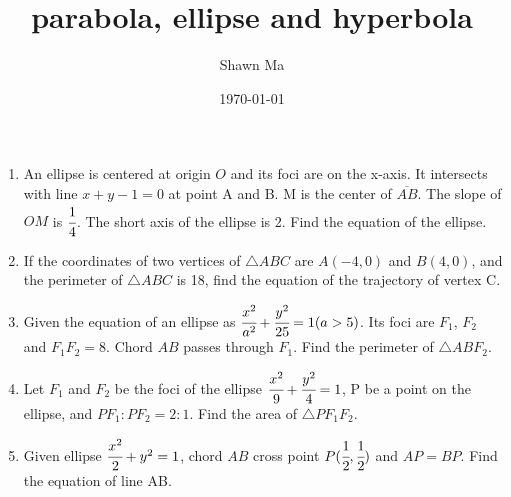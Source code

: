 \documentclass[letterpaper,12pt]{article}
\author{Shawn Ma}
\date{\today}
\title{parabola, ellipse and hyperbola}
\begin{document}
\setlength{\parindent}{0pt}

\begin{enumerate}
\item An ellipse is centered at origin $O$ and its foci are on the x-axis.
It intersects with line $x+y-1=0$ at point A and B. M is the center of $\overline{AB}$.
The slope of $OM$ is $\cfrac{1}{4}$. The short axis of the ellipse is 2.
Find the equation of the ellipse.

\item If the coordinates of two vertices of $\triangle{ABC}$ are $A(-4,0)$
 and $B(4,0)$, and the perimeter of $\triangle{ABC}$
 is 18, find the equation of the trajectory of vertex C.

\item Given the equation of an ellipse as $\cfrac{x^2}{a^2}+\cfrac{y^2}{25}=1(a>5)$. Its
foci are $F_1$, $F_2$ and $F_1F_2=8$. Chord $AB$ passes through $F_1$. Find the perimeter
of $\triangle{ABF_2}$.

\item Let $F_1$ and $F_2$ be the foci of the ellipse $\cfrac{x^2}{9}+\cfrac{y^2}{4}=1$,
P be a point on the ellipse, and $PF_1:PF_2 = 2:1$. Find the area of $\triangle{PF_1F_2}$.

\item Given ellipse $\cfrac{x^2}{2}+y^2=1$, chord $AB$ cross point $P(\cfrac{1}{2},\cfrac{1}{2})$ and
$AP=BP$. Find the equation of line AB.


\end{enumerate}
\end{document}
